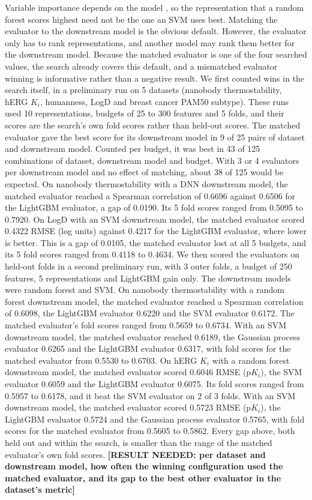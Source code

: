 Variable importance depends on the model \citep{Dong2020}, so the representation that a random forest scores highest need not be the one an SVM uses best. Matching the evaluator to the downstream model is the obvious default. However, the evaluator only has to rank representations, and another model may rank them better for the downstream model. Because the matched evaluator is one of the four searched values, the search already covers this default, and a mismatched evaluator winning is informative rather than a negative result. We first counted wins in the search itself, in a preliminary run on 5 datasets (nanobody thermostability, hERG $K_i$, humanness, LogD and breast cancer PAM50 subtype). These runs used 10 representations, budgets of 25 to 300 features and 5 folds, and their scores are the search's own fold scores rather than held-out scores. The matched evaluator gave the best score for its downstream model in 9 of 25 pairs of dataset and downstream model. Counted per budget, it was best in 43 of 125 combinations of dataset, downstream model and budget. With 3 or 4 evaluators per downstream model and no effect of matching, about 38 of 125 would be expected. On nanobody thermostability with a DNN downstream model, the matched evaluator reached a Spearman correlation of 0.6696 against 0.6506 for the LightGBM evaluator, a gap of 0.0190. Its 5 fold scores ranged from 0.5095 to 0.7920. On LogD with an SVM downstream model, the matched evaluator scored 0.4322 RMSE (log units) against 0.4217 for the LightGBM evaluator, where lower is better. This is a gap of 0.0105, the matched evaluator lost at all 5 budgets, and its 5 fold scores ranged from 0.4118 to 0.4634. We then scored the evaluators on held-out folds in a second preliminary run, with 3 outer folds, a budget of 250 features, 5 representations and LightGBM gain only. The downstream models were random forest and SVM. On nanobody thermostability with a random forest downstream model, the matched evaluator reached a Spearman correlation of 0.6098, the LightGBM evaluator 0.6220 and the SVM evaluator 0.6172. The matched evaluator's fold scores ranged from 0.5659 to 0.6734. With an SVM downstream model, the matched evaluator reached 0.6189, the Gaussian process evaluator 0.6265 and the LightGBM evaluator 0.6317, with fold scores for the matched evaluator from 0.5530 to 0.6703. On hERG $K_i$ with a random forest downstream model, the matched evaluator scored 0.6046 RMSE (p$K_i$), the SVM evaluator 0.6059 and the LightGBM evaluator 0.6075. Its fold scores ranged from 0.5957 to 0.6178, and it beat the SVM evaluator on 2 of 3 folds. With an SVM downstream model, the matched evaluator scored 0.5723 RMSE (p$K_i$), the LightGBM evaluator 0.5724 and the Gaussian process evaluator 0.5765, with fold scores for the matched evaluator from 0.5605 to 0.5862. Every gap above, both held out and within the search, is smaller than the range of the matched evaluator's own fold scores. \textbf{[RESULT NEEDED: per dataset and downstream model, how often the winning configuration used the matched evaluator, and its gap to the best other evaluator in the dataset's metric]}


